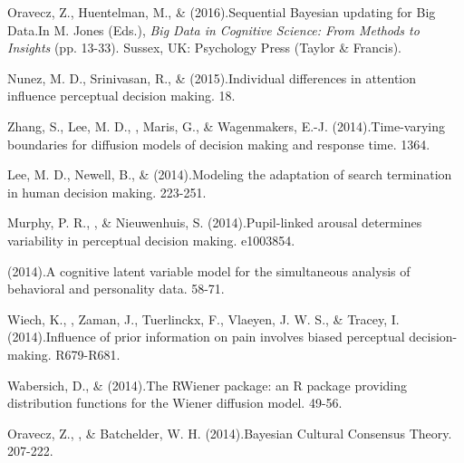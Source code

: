 \item[29.] Oravecz, Z., Huentelman, M., \& \vdkh{} (2016).\newblock Sequential Bayesian updating for Big Data.\newblock In M. Jones (Eds.), {\em Big Data in Cognitive Science: From Methods to Insights} (pp. 13-33). Sussex, UK: Psychology Press (Taylor \& Francis). %

\item[28.] Nunez, M. D., Srinivasan, R., \& \vdkh{} (2015).\newblock Individual differences in attention influence perceptual decision making. 18. %

\item[27.] Zhang, S., Lee, M. D., \vdkh{}, Maris, G., \& Wagenmakers, E.-J. (2014).\newblock Time-varying boundaries for diffusion models of decision making and response time. 1364. %

\item[26.] Lee, M. D., Newell, B., \& \vdkh{} (2014).\newblock Modeling the adaptation of search termination in human decision making. 223-251. %

\item[25.] Murphy, P. R., \vdkh{}, \& Nieuwenhuis, S. (2014).\newblock Pupil-linked arousal determines variability in perceptual decision making. e1003854. %

\item[24.] \vdkh{} (2014).\newblock A cognitive latent variable model for the simultaneous analysis of behavioral and personality data. 58-71. %

\item[23.] Wiech, K., \vdkh{}, Zaman, J., Tuerlinckx, F., Vlaeyen, J. W. S., \& Tracey, I. (2014).\newblock Influence of prior information on pain involves biased perceptual decision-making. R679-R681. %

\item[22.] Wabersich, D., \& \vdkh{} (2014).\newblock The RWiener package: an R package providing distribution functions for the Wiener diffusion model. 49-56. %

\item[21.] Oravecz, Z., \vdkh{}, \& Batchelder, W. H. (2014).\newblock Bayesian Cultural Consensus Theory. 207-222. %

